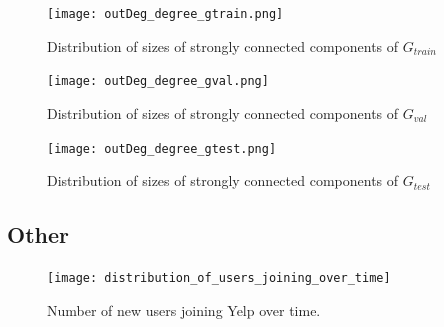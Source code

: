 \documentclass[letterpaper, 10 pt, conference]{ieeeconf}  %
\begin{document}
\begin{figure}[h!]
\centering
\texttt{[image: outDeg\_degree\_gtrain.png]}
\caption{Distribution of sizes of strongly connected components of $G_{train}$}
\label{fig:degree_distribution_g_train}
\end{figure}
\begin{figure}[h!]
\centering
\texttt{[image: outDeg\_degree\_gval.png]}
\caption{Distribution of sizes of strongly connected components of $G_{val}$}
\label{fig:degree_distribution_g_val}
\end{figure}
\begin{figure}[h!]
\centering
\texttt{[image: outDeg\_degree\_gtest.png]}
\caption{Distribution of sizes of strongly connected components of $G_{test}$}
\label{fig:degree_distribution_g_test}
\end{figure}


\subsection{Other}


\begin{figure}[h!]
\centering
\texttt{[image: distribution\_of\_users\_joining\_over\_time]}
\caption{Number of new users joining Yelp over time.}
\label{fig:users_join_over_time}
\end{figure}
\end{document}
